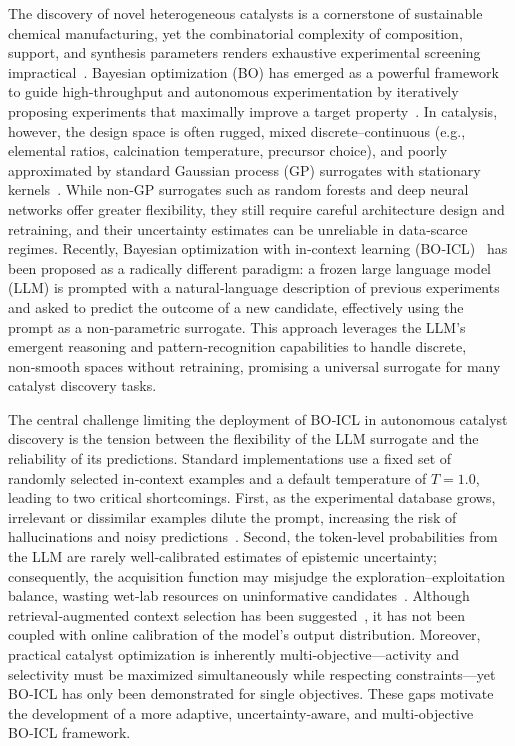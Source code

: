 \documentclass{article}
\begin{document}
The discovery of novel heterogeneous catalysts is a cornerstone of sustainable chemical manufacturing, yet the combinatorial complexity of composition, support, and synthesis parameters renders exhaustive experimental screening impractical~\cite{shields2021bayesian,romer2019net}. Bayesian optimization (BO) has emerged as a powerful framework to guide high-throughput and autonomous experimentation by iteratively proposing experiments that maximally improve a target property~\cite{brochu2010tutorial,hase2018phoenix}. In catalysis, however, the design space is often rugged, mixed discrete–continuous (e.g., elemental ratios, calcination temperature, precursor choice), and poorly approximated by standard Gaussian process (GP) surrogates with stationary kernels~\cite{shields2021bayesian}. While non‑GP surrogates such as random forests and deep neural networks offer greater flexibility, they still require careful architecture design and retraining, and their uncertainty estimates can be unreliable in data‑scarce regimes. Recently, Bayesian optimization with in‑context learning (BO‑ICL)~\cite{lang23boicl} has been proposed as a radically different paradigm: a frozen large language model (LLM) is prompted with a natural‑language description of previous experiments and asked to predict the outcome of a new candidate, effectively using the prompt as a non‑parametric surrogate. This approach leverages the LLM’s emergent reasoning and pattern‑recognition capabilities to handle discrete, non‑smooth spaces without retraining, promising a universal surrogate for many catalyst discovery tasks.  

The central challenge limiting the deployment of BO‑ICL in autonomous catalyst discovery is the tension between the flexibility of the LLM surrogate and the reliability of its predictions. Standard implementations use a fixed set of randomly selected in‑context examples and a default temperature of $T=1.0$, leading to two critical shortcomings. First, as the experimental database grows, irrelevant or dissimilar examples dilute the prompt, increasing the risk of hallucinations and noisy predictions~\cite{lang23boicl}. Second, the token‑level probabilities from the LLM are rarely well‑calibrated estimates of epistemic uncertainty; consequently, the acquisition function may misjudge the exploration–exploitation balance, wasting wet‑lab resources on uninformative candidates~\cite{guo2017calibration}. Although retrieval‑augmented context selection has been suggested~\cite{lewis2020retrieval}, it has not been coupled with online calibration of the model’s output distribution. Moreover, practical catalyst optimization is inherently multi‑objective—activity and selectivity must be maximized simultaneously while respecting constraints—yet BO‑ICL has only been demonstrated for single objectives. These gaps motivate the development of a more adaptive, uncertainty‑aware, and multi‑objective BO‑ICL framework.  
\end{document}
